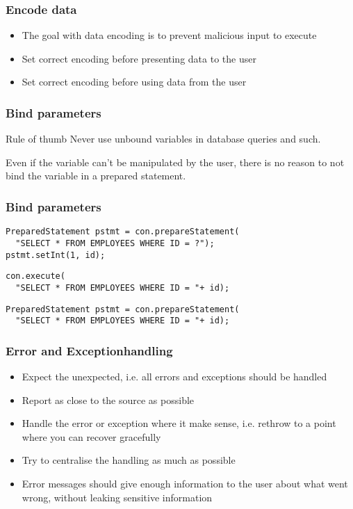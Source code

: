 \documentclass{beamer}
\begin{document}
    \begin{frame}
      \frametitle{Encode data}
      \begin{itemize}
        \item The goal with data encoding is to prevent malicious input to execute
        \item Set correct encoding before presenting data to the user
        \item Set correct encoding before using data from the user
      \end{itemize}
    \end{frame}
    \begin{frame}
      \frametitle{Bind parameters}
      \begin{block}{Rule of thumb}
        Never use unbound variables in database queries and such.

        Even if the variable can't be manipulated by the user, there is no reason
        to not bind the variable in a prepared statement.
      \end{block}
    \end{frame}
    \begin{frame}[fragile]
      \frametitle{Bind parameters}
      \begin{example}[Good]
      \begin{lstlisting}
PreparedStatement pstmt = con.prepareStatement(
  "SELECT * FROM EMPLOYEES WHERE ID = ?");
pstmt.setInt(1, id);
      \end{lstlisting}
      \end{example}
      \begin{example}[Bad]
      \begin{lstlisting}
con.execute(
  "SELECT * FROM EMPLOYEES WHERE ID = "+ id);
      \end{lstlisting}
      \end{example}
      \begin{example}[Worst]
      \begin{lstlisting}
PreparedStatement pstmt = con.prepareStatement(
  "SELECT * FROM EMPLOYEES WHERE ID = "+ id);
      \end{lstlisting}
      \end{example}
    \end{frame}
    \begin{frame}
      \frametitle{Error and Exceptionhandling}
      \begin{itemize}
        \item Expect the unexpected, i.e. all errors and exceptions should be handled
        \item Report as close to the source as possible
        \item Handle the error or exception where it make sense, i.e. rethrow to a point where you can recover gracefully
        \item Try to centralise the handling as much as possible
        \item Error messages should give enough information to the user about what went wrong, without leaking sensitive information
      \end{itemize}
    \end{frame}
\end{document}
